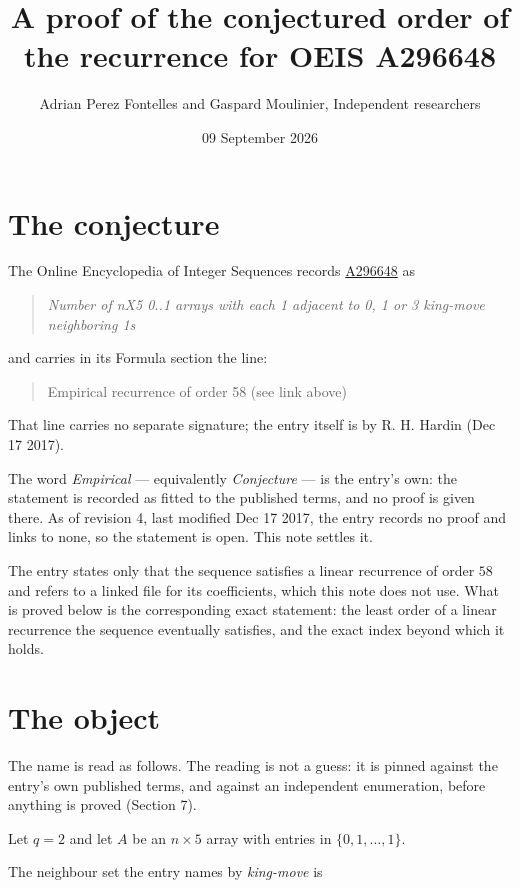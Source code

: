 \documentclass[11pt]{article}
\title{A proof of the conjectured order of the recurrence for OEIS A296648}
\author{Adrian Perez Fontelles and Gaspard Moulinier, Independent researchers}
\date{09 September 2026}
\theoremstyle{definition}
\begin{document}
\maketitle
\section{The conjecture}

The Online Encyclopedia of Integer Sequences records \href{https://oeis.org/A296648}{A296648} as

\begin{quote}\itshape Number of nX5 0..1 arrays with each 1 adjacent to 0, 1 or 3 king-move neighboring 1s\end{quote}

and carries in its Formula section the line:

\begin{quote}\ttfamily Empirical recurrence of order 58 (see link above)\end{quote}

That line carries no separate signature; the entry itself is by R. H. Hardin (Dec 17 2017).

The word {\itshape Empirical} --- equivalently {\itshape Conjecture} --- is the entry's own: the statement is recorded as fitted to the published terms, and no proof is given there. As of revision 4, last modified Dec 17 2017, the entry records no proof and links to none, so the statement is open. This note settles it.

The entry states only that the sequence satisfies a linear recurrence of order $58$ and refers to a linked file for its coefficients, which this note does not use. What is proved below is the corresponding exact statement: the least order of a linear recurrence the sequence eventually satisfies, and the exact index beyond which it holds.

\section{The object}

The name is read as follows. The reading is not a guess: it is pinned against the entry's own published terms, and against an independent enumeration, before anything is proved (Section 7).

Let $q = 2$ and let $A$ be an $n \times 5$ array with entries in $\{0,1,\dots,1\}$.

The neighbour set the entry names by {\itshape king-move} is
\end{document}
